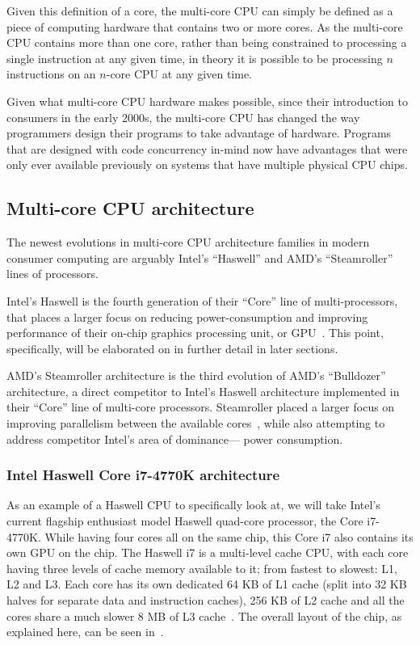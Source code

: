 \documentclass[a4paper,11pt]{article}
\begin{document}
Given this definition of a core, the multi-core CPU can simply be defined as a piece of computing hardware that contains
two or more cores. As the multi-core CPU contains more than one core, rather than being constrained to processing a single
instruction at any given time, in theory it is possible to be processing $n$ instructions on an $n$-core CPU at any given time.

Given what multi-core CPU hardware makes possible, since their introduction to consumers in the early 2000s, the multi-core
CPU has changed the way programmers design their programs to take advantage of hardware. Programs that are designed with
code concurrency in-mind now have advantages that were only ever available previously on systems that have multiple physical
CPU chips.

\subsection{Multi-core CPU architecture} %
\label{sub:multi_core_cpu_architecture}
The newest evolutions in multi-core CPU architecture families in modern consumer computing are arguably Intel's
``Haswell'' and AMD's ``Steamroller'' lines of processors.

Intel's Haswell is the fourth generation of their ``Core'' line of multi-processors, that places a larger focus on reducing power-consumption and improving performance of their on-chip graphics processing unit, or GPU~\cite{web:ForbesHaswell}. This point, specifically, will be elaborated on in further detail in later sections.

AMD's Steamroller architecture is the third evolution of AMD's ``Bulldozer''
architecture, a direct competitor to Intel's Haswell architecture implemented
in their ``Core'' line of multi-core processors. Steamroller placed a larger focus on improving parallelism between the available cores~\cite{web:AMDCCCSlides}, while also attempting to address competitor Intel's area of dominance--- power
consumption.

\subsubsection{Intel Haswell Core i7-4770K architecture} %
\label{subsub:intel_haswell_architecture}
As an example of a Haswell CPU to specifically look at, we will take Intel's
current flagship enthusiast model Haswell quad-core processor, the Core i7-4770K. While having four cores all on the same chip, this Core i7 also
contains its own GPU on the chip. The Haswell i7 is a multi-level cache CPU, with each core having three levels of cache memory
available to it; from fastest to slowest: L1, L2 and L3. Each core has its own
dedicated 64 KB of L1 cache (split into 32 KB halves for separate data and instruction caches), 256 KB of L2 cache and all the cores share a much slower 8 MB of L3 cache~\cite{web:TomsHWCorei7}. The overall layout of the chip, as explained here, can be seen in~.
\end{document}
